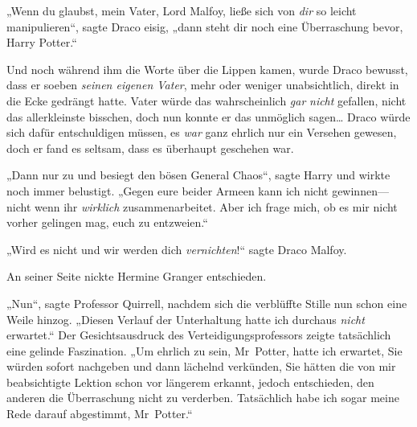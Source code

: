 „Wenn du glaubst, mein Vater, Lord Malfoy, ließe sich von \emph{dir} so leicht manipulieren“, sagte Draco eisig, „dann steht dir noch eine Überraschung bevor, Harry Potter.“

Und noch während ihm die Worte über die Lippen kamen, wurde Draco bewusst, dass er soeben \emph{seinen eigenen Vater}, mehr oder weniger unabsichtlich, direkt in die Ecke gedrängt hatte. Vater würde das wahrscheinlich \emph{gar} \emph{nicht} gefallen, nicht das allerkleinste bisschen, doch nun konnte er das unmöglich sagen… Draco würde sich dafür entschuldigen müssen, es \emph{war} ganz ehrlich nur ein Versehen gewesen, doch er fand es seltsam, dass es überhaupt geschehen war.

„Dann nur zu und besiegt den bösen General Chaos“, sagte Harry und wirkte noch immer belustigt. „Gegen eure beider Armeen kann ich nicht gewinnen—nicht wenn ihr \emph{wirklich} zusammenarbeitet. Aber ich frage mich, ob es mir nicht vorher gelingen mag, euch zu entzweien.“

„Wird es nicht und wir werden dich \emph{vernichten}!“ sagte Draco Malfoy.

An seiner Seite nickte Hermine Granger entschieden.

„Nun“, sagte Professor Quirrell, nachdem sich die verblüffte Stille nun schon eine Weile hinzog. „Diesen Verlauf der Unterhaltung hatte ich durchaus \emph{nicht} erwartet.“ Der Gesichtsausdruck des Verteidigungsprofessors zeigte tatsächlich eine gelinde Faszination. „Um ehrlich zu sein, Mr~Potter, hatte ich erwartet, Sie würden sofort nachgeben und dann lächelnd verkünden, Sie hätten die von mir beabsichtigte Lektion schon vor längerem erkannt, jedoch entschieden, den anderen die Überraschung nicht zu verderben. Tatsächlich habe ich sogar meine Rede darauf abgestimmt, Mr~Potter.“


